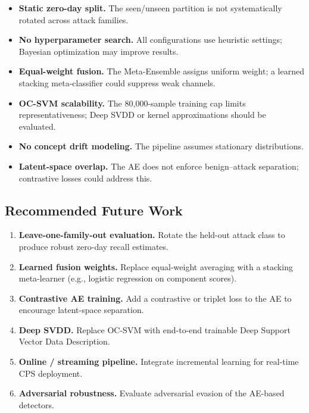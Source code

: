 \documentclass[10pt,conference]{IEEEtran}
\begin{document}
\begin{itemize}[leftmargin=*,noitemsep]
  \item \textbf{Static zero-day split.}  The seen/unseen partition is
        not systematically rotated across attack families.
  \item \textbf{No hyperparameter search.}  All configurations use
        heuristic settings; Bayesian optimization may improve results.
  \item \textbf{Equal-weight fusion.}  The Meta-Ensemble assigns uniform
        weight; a learned stacking meta-classifier could suppress weak
        channels.
  \item \textbf{OC-SVM scalability.}  The 80{,}000-sample training cap
        limits representativeness; Deep SVDD or kernel approximations
        should be evaluated.
  \item \textbf{No concept drift modeling.}  The pipeline assumes
        stationary distributions.
  \item \textbf{Latent-space overlap.}  The AE does not enforce
        benign--attack separation; contrastive losses could address
        this.
\end{itemize}

\subsection{Recommended Future Work}

\begin{enumerate}[leftmargin=*,noitemsep,topsep=0pt]
  \item \textbf{Leave-one-family-out evaluation.}  Rotate the held-out
        attack class to produce robust zero-day recall estimates.
  \item \textbf{Learned fusion weights.}  Replace equal-weight averaging
        with a stacking meta-learner (e.g., logistic regression on
        component scores).
  \item \textbf{Contrastive AE training.}  Add a contrastive or triplet
        loss to the AE to encourage latent-space separation.
  \item \textbf{Deep SVDD.}  Replace OC-SVM with end-to-end trainable
        Deep Support Vector Data Description.
  \item \textbf{Online / streaming pipeline.}  Integrate incremental
        learning for real-time CPS deployment.
  \item \textbf{Adversarial robustness.}  Evaluate adversarial evasion
        of the AE-based detectors.
\end{enumerate}
\end{document}

